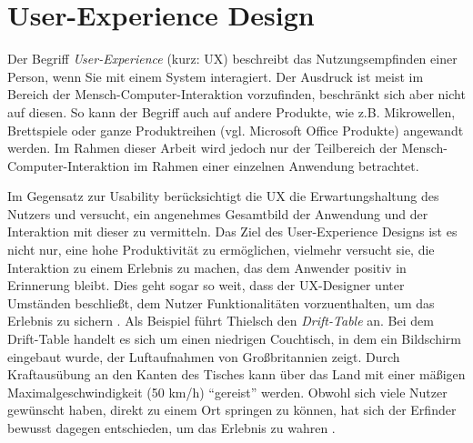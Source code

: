 \section{User-Experience Design} \label{sec:uxd}
Der Begriff \textit{User-Experience} (kurz: UX) beschreibt das Nutzungsempfinden einer Person, wenn Sie mit einem System interagiert. Der Ausdruck ist meist im Bereich der Mensch-Computer-Interaktion vorzufinden, beschränkt sich aber nicht auf diesen. \cite{Gube2010} So kann der Begriff auch auf andere Produkte, wie z.B. Mikrowellen, Brettspiele oder ganze Produktreihen (vgl. Microsoft Office Produkte) angewandt werden. Im Rahmen dieser Arbeit wird jedoch nur der Teilbereich der Mensch-Computer-Interaktion im Rahmen einer einzelnen Anwendung betrachtet. \par
Im Gegensatz zur Usability berücksichtigt die UX die Erwartungshaltung des Nutzers und versucht, ein angenehmes Gesamtbild der Anwendung und der Interaktion mit dieser zu vermitteln. Das Ziel des User-Experience Designs ist es nicht nur, eine hohe Produktivität zu ermöglichen, vielmehr versucht sie, die Interaktion zu einem Erlebnis zu machen, das dem Anwender positiv in Erinnerung bleibt. Dies geht sogar so weit, dass der UX-Designer unter Umständen beschließt, dem Nutzer Funktionalitäten vorzuenthalten, um das Erlebnis zu sichern \cite{Thielsch2015}. Als Beispiel führt Thielsch den \textit{Drift-Table} an. Bei dem Drift-Table handelt es sich um einen niedrigen Couchtisch, in dem ein Bildschirm eingebaut wurde, der Luftaufnahmen von Großbritannien zeigt. Durch Kraftausübung an den Kanten des Tisches kann über das Land mit einer mäßigen Maximalgeschwindigkeit (50 km/h) \enquote{gereist} werden. Obwohl sich viele Nutzer gewünscht haben, direkt zu einem Ort springen zu können, hat sich der Erfinder bewusst dagegen entschieden, um das Erlebnis zu wahren \cite{Thielsch2015}.\par

